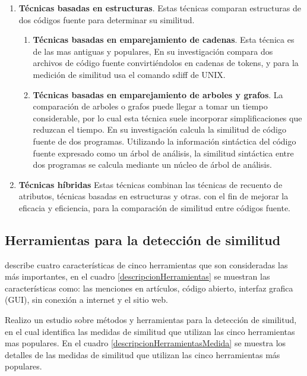 \begin{enumerate}
\begin{enumerate}
    \end{enumerate}
    \item \textbf{Técnicas basadas en estructuras}. Estas técnicas comparan estructuras de dos códigos fuente para determinar su similitud.
    \begin{enumerate}
      \item \textbf{Técnicas basadas en emparejamiento de cadenas}. Esta técnica es de las mas antiguas y populares, En su investigación \cite{Wise1992} compara dos archivos de código fuente convirtiéndolos en cadenas de tokens, y para la medición de similitud usa el comando sdiff de UNIX.
      \item \textbf{Técnicas basadas en emparejamiento de arboles y grafos}. La comparación de arboles o grafos puede llegar a tomar un tiempo considerable, por lo cual esta técnica suele incorporar simplificaciones que reduzcan el tiempo. En su investigación \cite{Song2015} calcula la similitud de código fuente de dos programas. Utilizando la información sintáctica del código fuente expresado como un árbol de análisis, la similitud sintáctica entre dos programas se calcula mediante un núcleo de árbol de análisis.
    \end{enumerate}
    \item \textbf{Técnicas híbridas} Estas técnicas combinan las técnicas de recuento de atributos, técnicas basadas en estructuras y otras. con el fin de mejorar la eficacia y eficiencia, para la comparación de similitud entre códigos fuente.
\end{enumerate}

\subsection{Herramientas para la detección de similitud}

\cite{Novak2019} describe cuatro características de cinco herramientas que son consideradas las más importantes, en el cuadro \ref{descripcionHerramientas} se muestran las características como: las menciones en artículos, código abierto, interfaz grafica (GUI), sin conexión a internet y el sitio web.



\cite{Ragkhitwetsagul2018} Realizo un estudio sobre métodos y herramientas para la detección de similitud, en el cual identifica las medidas de similitud que utilizan las cinco herramientas mas populares. En el cuadro \ref{descripcionHerramientasMedida} se muestra los detalles de las medidas de similitud que utilizan las cinco herramientas más populares.

